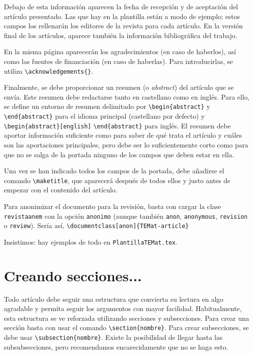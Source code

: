 \documentclass[bibtex]{TEMat-article}
\begin{document}
Debajo de esta información aparecen la fecha de recepción y de aceptación del artículo presentado.
Las que hay en la plantilla están a modo de ejemplo; estos campos los rellenarán los editores de la revista para cada artículo.
En la versión final de los artículos, aparece también la información bibliográfica del trabajo.

En la misma página aparecerán los agradecimientos (en caso de haberlos), así como las fuentes de financiación (en caso de haberlas).
Para introducirlas, se utiliza \verb+\acknowledgements{}+.

Finalmente, se debe proporcionar un resumen (o \textit{abstract}) del artículo que se envía. Este resumen debe redactarse tanto en castellano como en inglés.
Para ello, se define un entorno de resumen delimitado por \verb+\begin{abstract}+ y \verb+\end{abstract}+ para el idioma principal (castellano por defecto) y \verb+\begin{abstract}[english]+ \verb+\end{abstract}+ para inglés.
El resumen debe aportar información suficiente como para saber de qué trata el artículo y cuáles son las aportaciones principales, pero debe ser lo suficientemente corto como para que no se salga de la portada ninguno de los campos que deben estar en ella.

Una vez se han indicado todos los campos de la portada, debe añadirse el comando \verb+\maketitle+, que aparecerá después de todos ellos y justo antes de empezar con el contenido del artículo.

Para anonimizar el documento para la revisión, basta con cargar la clase \verb+revistaanem+ con la opción \verb+anonimo+ (aunque también \verb+anon+, \verb+anonymous+, \verb+revision+ o \verb+review+).
Sería así, \verb+\documentclass[anon]{TEMat-article}+

Insistimos: hay ejemplos de todo en \verb+PlantillaTEMat.tex+.



\section{Creando secciones...}

Todo artículo debe seguir una estructura que convierta su lectura en algo agradable y permita seguir los argumentos con mayor facilidad.
Habitualmente, esta estructura se ve reforzada utilizando secciones y subsecciones.
Para crear una sección basta con usar el comando \verb+\section{nombre}+.
Para crear subsecciones, se debe usar \verb+\subsection{nombre}+.
Existe la posibilidad de llegar hasta las subsubsecciones, pero recomendamos encarecidamente que no se haga esto.
\end{document}
